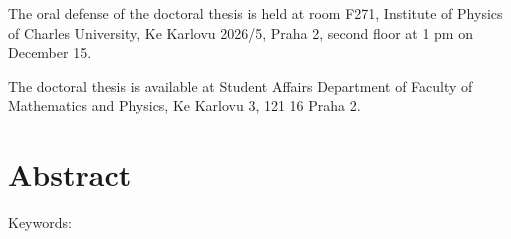 \noindent%
The oral defense of the doctoral thesis is held at room F271, Institute of
Physics of Charles University, Ke Karlovu 2026/5, Praha 2, second floor at 1 pm
on December 15.

The doctoral thesis is available at Student Affairs Department of Faculty of
Mathematics and Physics, Ke Karlovu 3, 121 16 Praha 2.

\newpage

\chapter*{Abstract}
\Abstract
\vspace{5mm}

\noindent%
Keywords:
\Keywords


\openright
\pagestyle{plain}
\setcounter{page}{1}
